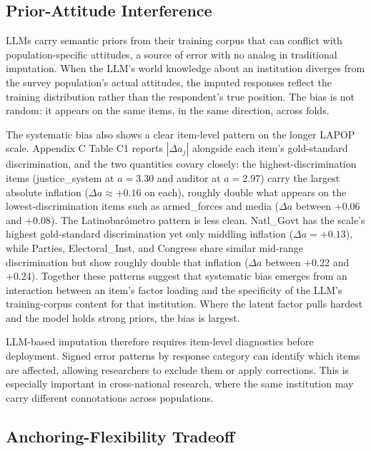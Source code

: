 \documentclass[
  man,
  floatsintext,
  longtable,
  nolmodern,
  notxfonts,
  notimes,
  colorlinks=true,linkcolor=blue,citecolor=blue,urlcolor=blue]{apa7}
\begin{document}
\subsection{Prior-Attitude
Interference}\label{prior-attitude-interference}

LLMs carry semantic priors from their training corpus that can conflict
with population-specific attitudes, a source of error with no analog in
traditional imputation. When the LLM's world knowledge about an
institution diverges from the survey population's actual attitudes, the
imputed responses reflect the training distribution rather than the
respondent's true position. The bias is not random: it appears on the
same items, in the same direction, across folds.

The systematic bias also shows a clear item-level pattern on the longer
LAPOP scale. Appendix C Table C1 reports \(|\Delta a_j|\) alongside each
item's gold-standard discrimination, and the two quantities covary
closely: the highest-discrimination items (justice\_system at
\(a = 3.30\) and auditor at \(a = 2.97\)) carry the largest absolute
inflation (\(\Delta a \approx +0.16\) on each), roughly double what
appears on the lowest-discrimination items such as armed\_forces and
media (\(\Delta a\) between +0.06 and +0.08). The Latinobarómetro
pattern is less clean. Natl\_Govt has the scale's highest gold-standard
discrimination yet only middling inflation (\(\Delta a = +0.13\)), while
Parties, Electoral\_Inst, and Congress share similar mid-range
discrimination but show roughly double that inflation (\(\Delta a\)
between +0.22 and +0.24). Together these patterns suggest that
systematic bias emerges from an interaction between an item's factor
loading and the specificity of the LLM's training-corpus content for
that institution. Where the latent factor pulls hardest and the model
holds strong priors, the bias is largest.

LLM-based imputation therefore requires item-level diagnostics before
deployment. Signed error patterns by response category can identify
which items are affected, allowing researchers to exclude them or apply
corrections. This is especially important in cross-national research,
where the same institution may carry different connotations across
populations.

\subsection{Anchoring-Flexibility
Tradeoff}\label{anchoring-flexibility-tradeoff}
\end{document}
